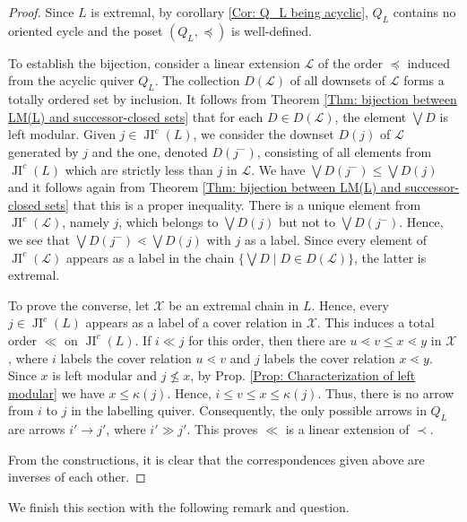 \documentclass{amsart}
\theoremstyle{thmstyle}
\theoremstyle{exstyle}
\theoremstyle{defstyle}
\theoremstyle{remstyle}
\theoremstyle{remstyle}
\DeclareMathOperator*{\JI}{JI}
\begin{document}
\begin{proof}
Since $L$ is extremal, by corollary \ref{Cor: Q_L being acyclic}, $Q_L$ contains no oriented cycle and the poset $(Q_L, \preceq)$ is well-defined.

To establish the bijection, consider a linear extension $\mathcal{L}$ of the order $\preceq$ induced from the acyclic quiver $Q_L$. The collection $D(\mathcal{L})$ of all downsets of $\mathcal{L}$ forms a totally ordered set by inclusion. It follows from Theorem \ref{Thm: bijection between LM(L) and successor-closed sets} that for each $D \in D(\mathcal{L})$, the element $\bigvee D$ is left modular. Given $j \in \JI^c(L)$, we consider the downset $D(j)$ of $\mathcal{L}$ generated by $j$ and the one, denoted $D(j^-)$, consisting of all elements from $\JI^c(L)$ which are strictly less than $j$ in $\mathcal{L}$. We have $\bigvee D(j^-) 
    \le \bigvee D(j)$ and it follows again from Theorem \ref{Thm: bijection between LM(L) and successor-closed sets} that this is a proper inequality. There is a unique element from $\JI^c(\mathcal{L})$, namely $j$, which belongs to $\bigvee D(j)$ but not to $\bigvee D(j^-)$. Hence, we see that $\bigvee D(j^-) \lessdot \bigvee D(j)$ with $j$ as a label. Since every element of $\JI^c(\mathcal{L})$ appears as a label in the chain  $\{\bigvee D \mid D \in D(\mathcal{L})\}$, the latter is extremal.

    To prove the converse, let $\mathcal{X}$ be an extremal chain in $L$. Hence, every $j \in \JI^c(L)$ appears as a label of a cover relation in $\mathcal{X}$. This induces a total order $\ll$ on $\JI^c(L)$. If $i \ll j$ for this order, then there are $u \lessdot v \le x \lessdot y$ in $\mathcal{X}$, where $i$ labels the cover relation $u \lessdot v$ and $j$ labels the cover relation $x \lessdot y$. Since $x$ is left modular and $j \not\le x$, by Prop. \ref{Prop: Characterization of left modular} we have $x \le \kappa(j)$. Hence, $i \le v \le x \le \kappa(j)$. Thus, there is no arrow from $i$ to $j$ in the labelling quiver. Consequently, the only possible arrows in $Q_L$ are arrows $i' \to j'$, where $i' \gg j'$. This proves $\ll$ is a linear extension of $\prec$.

    From the constructions, it is clear that the correspondences given above are inverses of each other. 
\end{proof}

We finish this section with the following remark and question.
\end{document}
